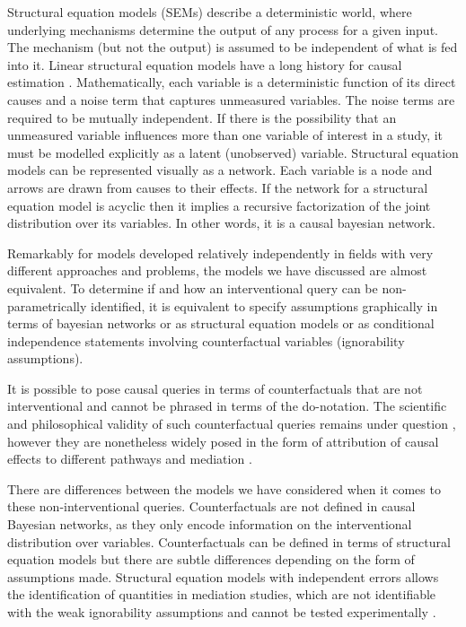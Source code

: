 \documentclass[11pt,a4paper]{article}
\begin{document}
Structural equation models (SEMs) describe a deterministic world, where underlying mechanisms determine the output of any process for a given input. The mechanism (but not the output) is assumed to be independent of what is fed into it. Linear structural equation models have a long history for causal estimation \cite {Wright1921,Haavelmo1943}. Mathematically, each variable is a deterministic function of its direct causes and a noise term that captures unmeasured variables. The noise terms are required to be mutually independent. If there is the possibility that an unmeasured variable influences more than one variable of interest in a study, it must be modelled explicitly as a latent (unobserved) variable. Structural equation models can be represented visually as a network. Each variable is a node and arrows are drawn from causes to their effects. If the network for a structural equation model is acyclic then it implies a recursive factorization of the joint distribution over its variables. In other words, it is a causal bayesian network. 

Remarkably for models developed relatively independently in fields with very different approaches and problems, the models we have discussed are almost equivalent. To determine if and how an interventional query can be non-parametrically identified, it is equivalent to specify assumptions graphically in terms of bayesian networks or as structural equation models or as conditional independence statements involving counterfactual variables (ignorability assumptions). 

It is possible to pose causal queries in terms of counterfactuals that are not interventional and cannot be phrased in terms of the do-notation. The scientific and philosophical validity of such counterfactual queries remains under question \cite{Dawid2000,Dawid2014}, however they are nonetheless widely posed in the form of attribution of causal effects to different pathways and mediation \cite{Pearl2014,Imai2010a,VanderWeele2011}. 

There are differences between the models we have considered when it comes to these non-interventional queries. Counterfactuals are not defined in causal Bayesian networks, as they only encode information on the interventional distribution over variables.  Counterfactuals can be defined in terms of structural equation models \cite{Pearl2000} but there are subtle differences depending on the form of assumptions made. Structural equation models with independent errors allows the identification of quantities in mediation studies, which are not identifiable with the weak ignorability assumptions and cannot be tested experimentally \cite{Richardson2013}.  
\end{document}
